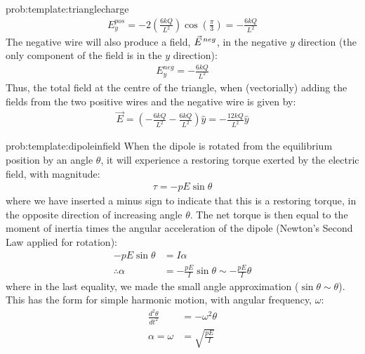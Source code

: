 \begin{solution}{prob:template:trianglecharge}
\begin{align*}
E_{y}^{pos}=-2 \left( \frac{6kQ}{L^2}  \right) \cos\left(\frac{\pi}{3} \right)=-\frac{6kQ}{L^2}
\end{align*}
The negative wire will also produce a field, $\pvec E^{neg}$, in the negative $y$ direction (the only component of the field is in the $y$ direction):
\begin{align*}
E_{y}^{neg}=- \frac{6kQ}{L^2}
\end{align*}
Thus, the total field at the centre of the triangle, when (vectorially) adding the fields from the two positive wires and the negative wire is given by:
\begin{align*}
\vec E = \left(-\frac{6kQ}{L^2} - \frac{6kQ}{L^2} \right)\hat y=- \frac{12kQ}{L^2}\hat y
\end{align*}
\end{solution}


\begin{solution}{prob:template:dipoleinfield}\label{soln:template:dipoleinfield}
When the dipole is rotated from the equilibrium position by an angle $\theta$, it will experience a restoring torque exerted by the electric field, with magnitude:
\begin{align*}
\tau = -pE\sin\theta 
\end{align*}
where we have inserted a minus sign to indicate that this is a restoring torque, in the opposite direction of increasing angle $\theta$. The net torque is then equal to the moment of inertia times the angular acceleration of the dipole (Newton's Second Law applied for rotation):
\begin{align*}
-pE\sin\theta &= I\alpha\\
\therefore \alpha &= -\frac{pE}{I}\sin\theta\sim-\frac{pE}{I}\theta
\end{align*}
where in the last equality, we made the small angle approximation ($\sin\theta\sim\theta$). This has the form for simple harmonic motion, with angular frequency, $\omega$:
\begin{align*}
\frac{d^2\theta}{dt^2}&=-\omega^2 \theta\\
\alpha=\omega &=\sqrt{\frac{pE}{I}}
\end{align*}
\end{solution}

